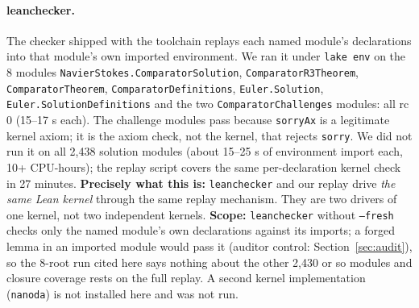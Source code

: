 \documentclass[10pt]{article}
\newcommand{\lean}[1]{\texttt{#1}}
\renewcommand{\_}{\textunderscore\allowbreak}
\begin{document}
\paragraph{leanchecker.} The checker shipped with the toolchain replays each named module's declarations into that module's own imported environment. We ran it under \lean{lake env} on the 8 modules \lean{NavierStokes.ComparatorSolution}, \lean{ComparatorR3Theorem}, \lean{ComparatorTheorem}, \lean{ComparatorDefinitions}, \lean{Euler.Solution},
\lean{Euler.SolutionDefinitions} and the two \lean{ComparatorChallenges} modules: all rc 0 (15--17 s each). The challenge modules pass because \lean{sorryAx} is a legitimate kernel axiom; it is the axiom check, not the kernel, that rejects \lean{sorry}. We did not run it on all 2,438 solution modules (about 15--25 s of environment import each, 10+ CPU-hours); the replay script covers the same per-declaration kernel check in
27 minutes. \textbf{Precisely what this is:} \texttt{leanchecker} and our replay drive \emph{the same Lean kernel} through the same replay mechanism. They are two drivers of one kernel, not two independent kernels. \textbf{Scope:} \lean{leanchecker} without \lean{--fresh} checks only the named module's own declarations against its imports; a forged lemma in an imported module would pass it (auditor control: Section~\ref{sec:audit}), so the 8-root run cited here says nothing about the other 2,430 or so modules and closure coverage rests on the full replay. A second kernel implementation (\texttt{nanoda}) is not installed here and was not run.
\end{document}
